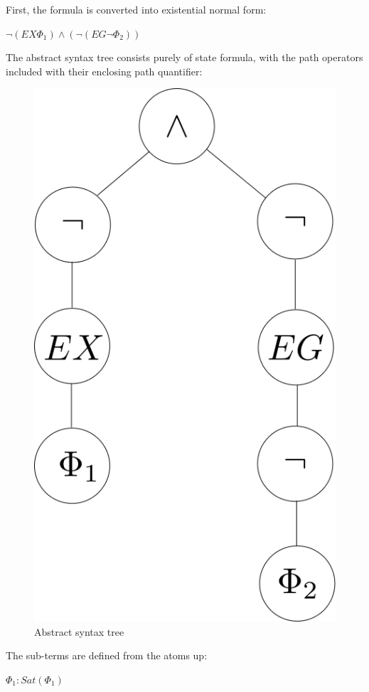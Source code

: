 First, the formula is converted into existential normal form:

$\neg (EX \Phi_1) \wedge (\neg (EG \neg \Phi_2))$

The abstract syntax tree consists purely of state formula,
with the path operators included with their enclosing path quantifier:

\begin{figure}[!htb]
\centering
\includegraphics[scale=.4]{abstract_syntax_tree.png}
\caption{Abstract syntax tree}
\label{fig:ast}
\end{figure}

The sub-terms are defined from the atoms up:

$\Phi_1: Sat(\Phi_1)$

